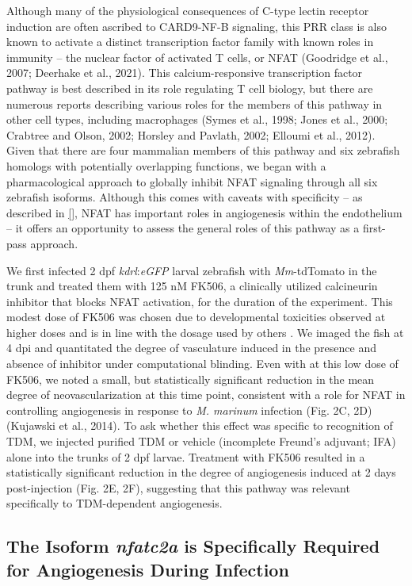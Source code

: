 Although many of the physiological consequences of C-type lectin receptor induction are often ascribed to CARD9-NF-\textkappa B signaling, this PRR class is also known to activate a distinct transcription factor family with known roles in immunity -- the nuclear factor of activated T cells, or NFAT (Goodridge et al., 2007; Deerhake et al., 2021). This calcium-responsive transcription factor pathway is best described in its role regulating T cell biology, but there are numerous reports describing various roles for the members of this pathway in other cell types, including macrophages (Symes et al., 1998; Jones et al., 2000; Crabtree and Olson, 2002; Horsley and Pavlath, 2002; Elloumi et al., 2012). Given that there are four mammalian members of this pathway and six zebrafish homologs with potentially overlapping functions, we began with a pharmacological approach to globally inhibit NFAT signaling through all six zebrafish isoforms. Although this comes with caveats with specificity -- as described in \autoref{}, NFAT has important roles in angiogenesis within the endothelium -- it offers an opportunity to assess the general roles of this pathway as a first-pass approach. 

We first infected 2 dpf \textit{kdrl}:\textit{eGFP} larval zebrafish with \textit{Mm}-tdTomato in the trunk and treated them with 125 nM FK506, a clinically utilized calcineurin inhibitor that blocks NFAT activation, for the duration of the experiment. This modest dose of FK506 was chosen due to developmental toxicities observed at higher doses and is in line with the dosage used by others \citep{Kujawski2014}. We imaged the fish at 4 dpi and quantitated the degree of vasculature induced in the presence and absence of inhibitor under computational blinding. Even with at this low dose of FK506, we noted a small, but statistically significant reduction in the mean degree of neovascularization at this time point, consistent with a role for NFAT in controlling angiogenesis in response to \textit{M. marinum} infection (Fig. 2C, 2D) (Kujawski et al., 2014). To ask whether this effect was specific to recognition of TDM, we injected purified TDM or vehicle (incomplete Freund's adjuvant; IFA) alone into the trunks of 2 dpf larvae. Treatment with FK506 resulted in a statistically significant reduction in the degree of angiogenesis induced at 2 days post-injection (Fig. 2E, 2F), suggesting that this pathway was relevant specifically to TDM-dependent angiogenesis.

\subsection{The Isoform \textit{nfatc2a} is Specifically Required for Angiogenesis During Infection}

